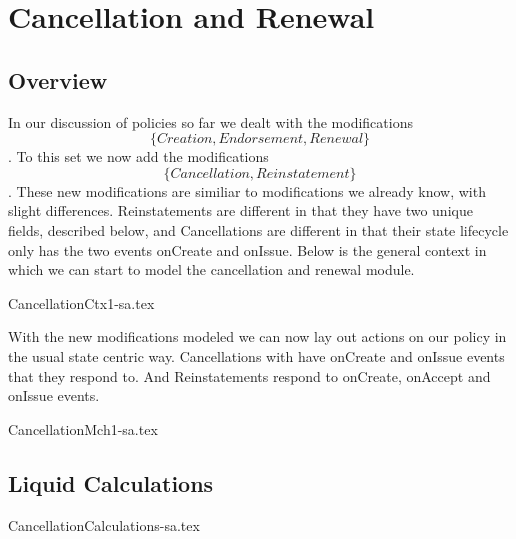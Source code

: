 %
%
%
\chapter{Cancellation and Renewal}
\label{intro} %


\section{Overview}
\label{sec:02:1}
In our discussion of policies so far we dealt with the modifications
\begin{equation*}
  \{Creation, Endorsement, Renewal\}
\end{equation*}
. To this set we now
add the modifications
\begin{equation*}
  \{Cancellation, Reinstatement\}
\end{equation*}
. These new modifications are similiar to modifications we already
know, with slight differences. Reinstatements are different in that they have two unique fields, described below, and Cancellations
are different in that their state lifecycle only has the two events onCreate and onIssue. Below is the general context in which
we can start to model the cancellation and renewal module.

{CancellationCtx1-sa.tex}

With the new modifications modeled we can now lay out actions on our policy in the usual state centric way. Cancellations with have
onCreate and onIssue events that they respond to. And Reinstatements respond to onCreate, onAccept and onIssue events. 

{CancellationMch1-sa.tex}

\section{Liquid Calculations}
\label{sec:02:2}

{CancellationCalculations-sa.tex}
